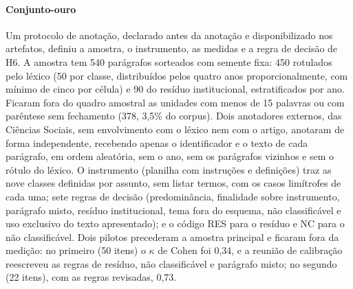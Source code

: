 \documentclass[fleqn,10pt]{SelfArx}
\begin{document}
\paragraph{Conjunto-ouro} Um protocolo de anotação, declarado antes da anotação e disponibilizado nos artefatos, definiu a amostra, o instrumento, as medidas e a regra de decisão de H6. A amostra tem 540 parágrafos sorteados com semente fixa: 450 rotulados pelo léxico (50 por classe, distribuídos pelos quatro anos proporcionalmente, com mínimo de cinco por célula) e 90 do resíduo institucional, estratificados por ano. Ficaram fora do quadro amostral as unidades com menos de 15 palavras ou com parêntese sem fechamento (378, 3,5\% do corpus). Dois anotadores externos, das Ciências Sociais, sem envolvimento com o léxico nem com o artigo, anotaram de forma independente, recebendo apenas o identificador e o texto de cada parágrafo, em ordem aleatória, sem o ano, sem os parágrafos vizinhos e sem o rótulo do léxico. O instrumento (planilha com instruções e definições) traz as nove classes definidas por assunto, sem listar termos, com os casos limítrofes de cada uma; sete regras de decisão (predominância, finalidade sobre instrumento, parágrafo misto, resíduo institucional, tema fora do esquema, não classificável e uso exclusivo do texto apresentado); e o código RES para o resíduo e NC para o não classificável. Dois pilotos precederam a amostra principal e ficaram fora da medição: no primeiro (50 itens) o $\kappa$ de Cohen foi 0,34, e a reunião de calibração reescreveu as regras de resíduo, não classificável e parágrafo misto; no segundo (22 itens), com as regras revisadas, 0,73.
\end{document}
